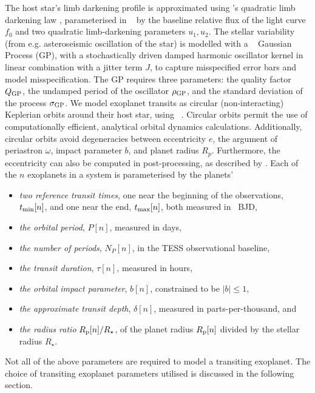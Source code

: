 \documentclass[floatfix,ApJL,twocolumn]{aastex631}
\begin{document}
The host star's limb darkening profile is approximated using \citet{Kipping:2013:MNRAS}'s quadratic limb darkening law \citep{Claret:2000:A&A, Mandel:2002:ApJL}, parameterised in \starry~\citep{Luger:2019:AJ} by the baseline relative flux of the light curve $f_0$ and two quadratic limb-darkening parameters $u_1, u_2$.
The stellar variability (from e.g. asteroseismic oscillation of the star) is modelled with a \celerite~\citep{Foreman-Mackey:2017:ascl} Gaussian Process (GP), with a stochastically driven damped harmonic oscillator kernel in linear combination with a jitter term $J$, to capture misspecified error bars and model misspecification.
The GP requires three parameters: the quality factor $Q_{\rm GP}$, the undamped period of the oscillator $\rho_{\rm GP}$, and the standard deviation of the process $\sigma_{\rm GP}$. 
We model exoplanet transits as circular (non-interacting) Keplerian orbits around their host star, using \exoplanet~\citep{Foreman-Mackey:2021:JOSS}. 
Circular orbits permit the use of computationally efficient, analytical orbital dynamics calculations.
Additionally, circular orbits avoid degeneracies between eccentricity $e$, the argument of periastron $\omega$, impact parameter $b$, and planet radius $R_p$. 
Furthermore, the eccentricity can also be computed in post-processing, as described by \citet{Dawson:2012:ApJ}.
Each of the $n$ exoplanets in a system is parameterised by the planets'
\begin{itemize}
  \item \emph{two reference transit times}, one near the beginning of the observations, $\operatorname{\mathnormal{t_{\rm min}}}[n]$, and one near the end, $\operatorname{\mathnormal{t_{\rm max}}}[n]$, both measured in \tess\ BJD,
  \item \emph{the orbital period}, $P[n]$, measured in days,
  \item \emph{the number of periods}, $N_P[n]$, in the TESS observational baseline,
  \item \emph{the transit duration}, $\tau[n]$, measured in hours,
  \item \emph{the orbital impact parameter}, $b[n]$, constrained to be $|b| \le 1$,
  \item \emph{the approximate transit depth}, $\delta[n]$, measured in parts-per-thousand, and
  \item \emph{the radius ratio} $R_{\rm p}[n] / R_\star$, of the planet radius $R_{\rm p}[n]$ divided by the stellar radius $R_\star$.
\end{itemize}
Not all of the above parameters are required to model a transiting exoplanet. 
The choice of transiting exoplanet parameters utilised is discussed in the following section.
\end{document}
